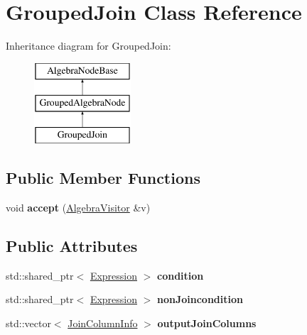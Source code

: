 \hypertarget{class_grouped_join}{\section{Grouped\+Join Class Reference}
\label{class_grouped_join}
}
Inheritance diagram for Grouped\+Join\+:\begin{figure}[H]
\begin{center}
\leavevmode
\includegraphics[height=3.000000cm]{class_grouped_join}
\end{center}
\end{figure}
\subsection*{Public Member Functions}
\begin{DoxyCompactItemize}
\item 
\hypertarget{class_grouped_join_aa067c1a349478bfdeae77ed3a541375d}{void {\bfseries accept} (\hyperlink{class_algebra_visitor}{Algebra\+Visitor} \&v)}\label{class_grouped_join_aa067c1a349478bfdeae77ed3a541375d}

\end{DoxyCompactItemize}
\subsection*{Public Attributes}
\begin{DoxyCompactItemize}
\item 
\hypertarget{class_grouped_join_a517b47e21d6852335b50537c474c9c62}{std\+::shared\+\_\+ptr$<$ \hyperlink{class_expression}{Expression} $>$ {\bfseries condition}}\label{class_grouped_join_a517b47e21d6852335b50537c474c9c62}

\item 
\hypertarget{class_grouped_join_ae1cd2d5ce317a02f65249e45451e3391}{std\+::shared\+\_\+ptr$<$ \hyperlink{class_expression}{Expression} $>$ {\bfseries non\+Joincondition}}\label{class_grouped_join_ae1cd2d5ce317a02f65249e45451e3391}

\item 
\hypertarget{class_grouped_join_ab4e436f7abb9990000a7f2ef0596960e}{std\+::vector$<$ \hyperlink{class_join_column_info}{Join\+Column\+Info} $>$ {\bfseries output\+Join\+Columns}}\label{class_grouped_join_ab4e436f7abb9990000a7f2ef0596960e}

\end{DoxyCompactItemize}


